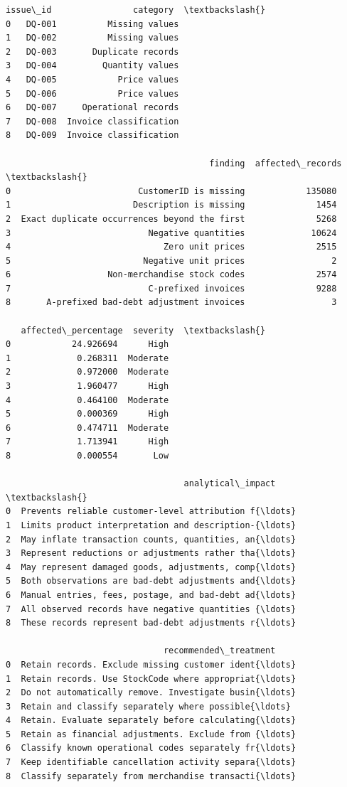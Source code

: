 \documentclass[11pt]{article}
\begin{document}
    
    \begin{Verbatim}[commandchars=\\\{\}]
  issue\_id                category  \textbackslash{}
0   DQ-001          Missing values   
1   DQ-002          Missing values   
2   DQ-003       Duplicate records   
3   DQ-004         Quantity values   
4   DQ-005            Price values   
5   DQ-006            Price values   
6   DQ-007     Operational records   
7   DQ-008  Invoice classification   
8   DQ-009  Invoice classification   

                                        finding  affected\_records  \textbackslash{}
0                         CustomerID is missing            135080   
1                        Description is missing              1454   
2  Exact duplicate occurrences beyond the first              5268   
3                           Negative quantities             10624   
4                              Zero unit prices              2515   
5                          Negative unit prices                 2   
6                   Non-merchandise stock codes              2574   
7                           C-prefixed invoices              9288   
8       A-prefixed bad-debt adjustment invoices                 3   

   affected\_percentage  severity  \textbackslash{}
0            24.926694      High   
1             0.268311  Moderate   
2             0.972000  Moderate   
3             1.960477      High   
4             0.464100  Moderate   
5             0.000369      High   
6             0.474711  Moderate   
7             1.713941      High   
8             0.000554       Low   

                                   analytical\_impact  \textbackslash{}
0  Prevents reliable customer-level attribution f{\ldots}   
1  Limits product interpretation and description-{\ldots}   
2  May inflate transaction counts, quantities, an{\ldots}   
3  Represent reductions or adjustments rather tha{\ldots}   
4  May represent damaged goods, adjustments, comp{\ldots}   
5  Both observations are bad-debt adjustments and{\ldots}   
6  Manual entries, fees, postage, and bad-debt ad{\ldots}   
7  All observed records have negative quantities {\ldots}   
8  These records represent bad-debt adjustments r{\ldots}   

                               recommended\_treatment  
0  Retain records. Exclude missing customer ident{\ldots}  
1  Retain records. Use StockCode where appropriat{\ldots}  
2  Do not automatically remove. Investigate busin{\ldots}  
3  Retain and classify separately where possible{\ldots}  
4  Retain. Evaluate separately before calculating{\ldots}  
5  Retain as financial adjustments. Exclude from {\ldots}  
6  Classify known operational codes separately fr{\ldots}  
7  Keep identifiable cancellation activity separa{\ldots}  
8  Classify separately from merchandise transacti{\ldots}  
    \end{Verbatim}
\end{document}
